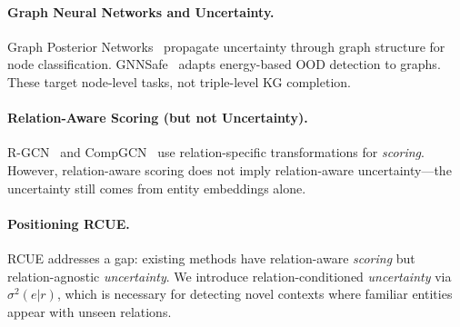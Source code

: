 \paragraph{Graph Neural Networks and Uncertainty.}
Graph Posterior Networks~\citep{stadler2021graph} propagate uncertainty through graph structure for node classification. GNNSafe~\citep{wu2023energy} adapts energy-based OOD detection to graphs. These target node-level tasks, not triple-level KG completion.

\paragraph{Relation-Aware Scoring (but not Uncertainty).}
R-GCN~\citep{schlichtkrull2018modeling} and CompGCN~\citep{vashishth2020composition} use relation-specific transformations for \emph{scoring}. However, relation-aware scoring does not imply relation-aware uncertainty---the uncertainty still comes from entity embeddings alone.

\paragraph{Positioning RCUE.}
RCUE addresses a gap: existing methods have relation-aware \emph{scoring} but relation-agnostic \emph{uncertainty}. We introduce relation-conditioned \emph{uncertainty} via $\sigma^2(e|r)$, which is necessary for detecting novel contexts where familiar entities appear with unseen relations.
